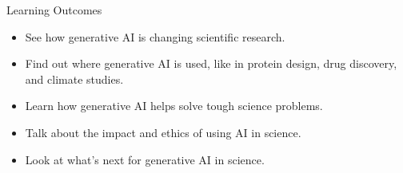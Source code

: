 \begin{frame}{Learning Outcomes}
\begin{itemize}
    \item See how generative AI is changing scientific research.
    \item Find out where generative AI is used, like in protein design, drug discovery, and climate studies.
    \item Learn how generative AI helps solve tough science problems.
    \item Talk about the impact and ethics of using AI in science.
    \item Look at what’s next for generative AI in science.
\end{itemize}

\end{frame}